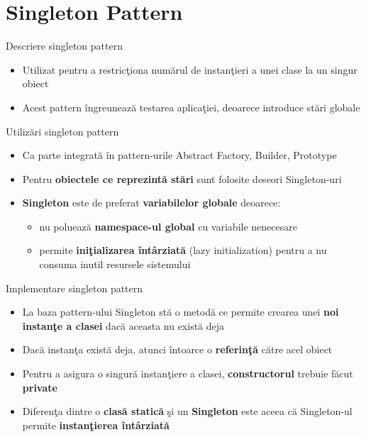 \documentclass{beamer}
\begin{document}
\section{Singleton Pattern}

\begin{frame}{Descriere singleton pattern}
	\begin{itemize}
		\item Utilizat pentru a restricţiona numărul de instanţieri a unei clase la un singur obiect
		\vspace{4mm}
		\item \alert{Acest pattern îngreunează testarea aplicaţiei, deoarece introduce stări globale}
	\end{itemize}
\end{frame}

\begin{frame}{Utilizări singleton pattern}
	\begin{itemize}
		\item Ca parte integrată în pattern-urile Abstract Factory, Builder, Prototype
		\vspace{4mm}
		\item Pentru \textbf{obiectele ce reprezintă stări} sunt folosite deseori Singleton-uri
		\vspace{4mm}
		\item \textbf{Singleton} este de preferat \textbf{variabilelor globale} deoarece:
			\begin{itemize}
				\item nu poluează \textbf{namespace-ul global} cu variabile nenecesare 
				\item permite \textbf{iniţializarea întârziată} (lazy initialization) pentru a nu consuma inutil resursele sistemului
			\end{itemize}
	\end{itemize}
\end{frame}

\begin{frame}{Implementare singleton pattern}
	\begin{itemize}
		\item La baza pattern-ului Singleton stă o metodă ce permite crearea unei \textbf{noi instanţe a clasei} dacă aceasta nu există deja
		\vspace{4mm}
		\item Dacă instanţa există deja, atunci întoarce o \textbf{referinţă} către acel obiect
		\vspace{4mm}
		\item Pentru a asigura o singură instanţiere a clasei, \textbf{constructorul} trebuie făcut \textbf{private}
		\vspace{4mm}
		\item Diferenţa dintre o \textbf{clasă statică} şi un \textbf{Singleton} este aceea că Singleton-ul permite \textbf{instanţierea întârziată}
	\end{itemize}
\end{frame}
\end{document}
